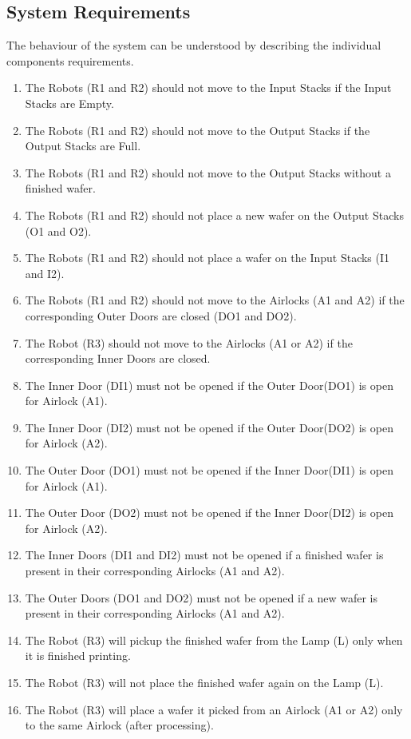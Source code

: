 \documentclass[a4paper,12pt]{article}
\begin{document}
\subsection{System Requirements}
The behaviour of the system can be understood by describing the individual components requirements.
\begin{enumerate}
\item The Robots (R1 and R2) should not move to the Input Stacks if the Input Stacks are Empty.

\item The Robots (R1 and R2) should not move to the Output Stacks if the Output Stacks are Full.
\item The Robots (R1 and R2) should not move to the Output Stacks without a finished wafer.
\item The Robots (R1 and R2) should not place a new wafer on the Output Stacks (O1 and O2).
\item The Robots (R1 and R2) should not place a wafer on the Input Stacks (I1 and I2).
\item The Robots (R1 and R2) should not move to the Airlocks (A1 and A2) if the corresponding Outer Doors are closed (DO1 and DO2).
\item The Robot (R3) should not move to the Airlocks (A1 or A2) if the corresponding Inner Doors are closed.
\item The Inner Door (DI1) must not be opened if the Outer Door(DO1) is open for Airlock (A1).
\item The Inner Door (DI2) must not be opened if the Outer Door(DO2) is open for Airlock (A2).
\item The Outer Door (DO1) must not be opened if the Inner Door(DI1) is open for Airlock (A1).
\item The Outer Door (DO2) must not be opened if the Inner Door(DI2) is open for Airlock (A2).
\item The Inner Doors (DI1 and DI2) must not be opened if a finished wafer is present in their corresponding Airlocks (A1 and A2).
\item The Outer Doors (DO1 and DO2) must not be opened if a new wafer is present in their corresponding Airlocks (A1 and A2).
\item The Robot (R3) will pickup the finished wafer from the Lamp (L) only when it is finished printing.
\item The Robot (R3) will not place the finished wafer again on the Lamp (L).
\item The Robot (R3) will place a wafer it picked from an Airlock (A1 or A2) only to the same Airlock (after processing). 
\end{enumerate}
\newpage
\end{document}
